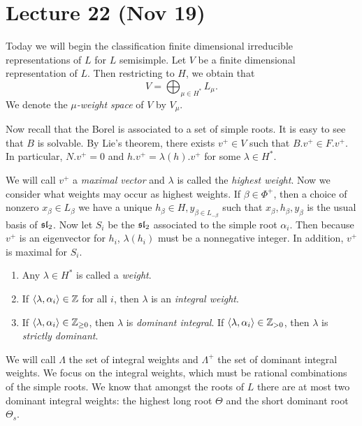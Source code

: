 \documentclass[twoside, 10pt]{article}
\begin{document}
    \section{Lecture 22 (Nov 19)}%

    Today we will begin the classification finite dimensional irreducible
    representations of $L$ for $L$ semisimple. Let $V$ be a finite dimensional
    representation of $L$. Then restricting to $H$, we obtain that \[V =
    \bigoplus_{\mu \in H^*} L_{\mu}.\] We denote the \textit{$\mu$-weight
    space} of $V$ by $V_{\mu}$. 

    Now recall that the Borel is associated to a set of simple roots. It is
    easy to see that $B$ is solvable. By Lie's theorem, there exists $v^+ \in
    V$ such that $B.v^+ \in F.v^+$. In particular, $N.v^+ = 0$ and $h.v^+ =
    \lambda(h).v^+$ for some $\lambda \in H^*$.
    
    We will call $v^+$ a \textit{maximal vector} and $\lambda$ is called the
    \textit{highest weight}. Now we consider what weights may occur as highest
    weights. If $\beta \in \Phi^+$, then a choice of nonzero $x_{\beta} \in
    L_{\beta}$ we have a unique $h_{\beta} \in H, y_{\beta \in L_{-\beta}}$
    such that $x_{\beta}, h_{\beta}, y_{\beta}$ is the usual basis of
    $\mathfrak{sl}_2$. Now let $S_i$ be the $\mathfrak{sl}_2$ associated to the simple root
    $\alpha_i$. Then because $v^+$ is an eigenvector for $h_i$, $\lambda(h_i)$
    must be a nonnegative integer. In addition, $v^+$ is maximal for $S_i$.

    \begin{defn} \begin{enumerate} \item Any $\lambda \in H^*$ is called a
        \textit{weight}.  \item If $\langle\lambda, \alpha_i\rangle \in \mathbb{Z}$ for all
        $i$, then $\lambda$ is an \textit{integral weight}.  \item If
        $\langle\lambda, \alpha_i\rangle \in \mathbb{Z}_{\geq 0}$, then $\lambda$ is
        \textit{dominant integral}. If $\langle\lambda, \alpha_i\rangle \in \mathbb{Z}_{>0}$,
        then $\lambda$ is \textit{strictly dominant}.  \end{enumerate}
    \end{defn}

    We will call $\Lambda$ the set of integral weights and $\Lambda^+$ the set
    of dominant integral weights. We focus on the integral weights, which must
    be rational combinations of the simple roots. We know that amongst the
    roots of $L$ there are at most two dominant integral weights: the highest
    long root $\Theta$ and the short dominant root $\Theta_s$.
\end{document}
